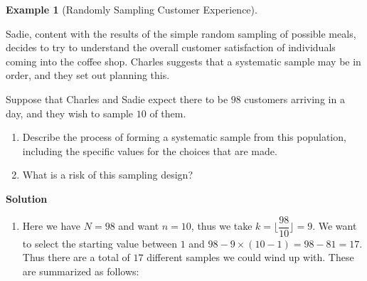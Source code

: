 \documentclass[
  letterpaper,
  DIV=11,
  numbers=noendperiod]{scrreprt}
\providecommand{\tightlist}{%
  \setlength{\itemsep}{0pt}\setlength{\parskip}{0pt}}\usepackage{longtable,booktabs,array}
\theoremstyle{definition}
\theoremstyle{definition}
\newtheorem{example}{Example}[chapter]
\theoremstyle{definition}
\theoremstyle{remark}
\begin{document}
\begin{example}[Randomly Sampling Customer
Experience]\protect\hypertarget{exm-systematic-sampling}{}\label{exm-systematic-sampling}

Sadie, content with the results of the simple random sampling of
possible meals, decides to try to understand the overall customer
satisfaction of individuals coming into the coffee shop. Charles
suggests that a systematic sample may be in order, and they set out
planning this.

Suppose that Charles and Sadie expect there to be \(98\) customers
arriving in a day, and they wish to sample \(10\) of them.

\begin{enumerate}
\def\labelenumi{\alph{enumi}.}
\tightlist
\item
  Describe the process of forming a systematic sample from this
  population, including the specific values for the choices that are
  made.
\item
  What is a risk of this sampling design?
\end{enumerate}

\begin{tcolorbox}[enhanced jigsaw, colback=white, colframe=quarto-callout-color-frame, arc=.35mm, leftrule=.75mm, rightrule=.15mm, opacityback=0, breakable, bottomrule=.15mm, left=2mm, toprule=.15mm]

\vspace{-3mm}\textbf{Solution}\vspace{3mm}

\begin{enumerate}
\def\labelenumi{\alph{enumi}.}
\tightlist
\item
  Here we have \(N=98\) and want \(n=10\), thus we take
  \(k = \lfloor\dfrac{98}{10}\rfloor = 9\). We want to select the
  starting value between \(1\) and
  \(98 - 9\times(10-1) = 98 - 81 = 17\). Thus there are a total of
  \(17\) different samples we could wind up with. These are summarized
  as follows:
\end{enumerate}


\end{tcolorbox}
\end{example}
\end{document}
